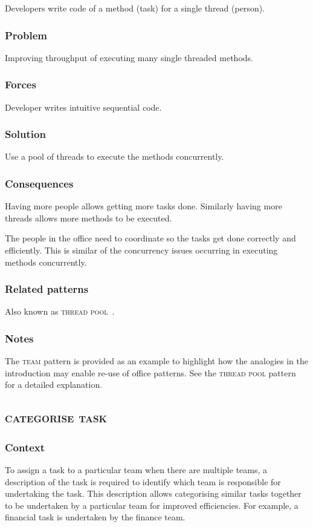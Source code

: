\documentclass[prodmode]{style/acmlarge}
\begin{document}
Developers write code of a method (task) for a single thread (person).

\subsubsection*{Problem} Improving throughput of executing many single threaded methods.

\subsubsection*{Forces} Developer writes intuitive sequential code.

\subsubsection*{Solution} Use a pool of threads to execute the methods
concurrently.

\subsubsection*{Consequences} Having more people allows getting more tasks done.
Similarly having more threads allows more methods to be executed.

The people in the office need to coordinate so the tasks get done correctly and
efficiently.  This is similar of the concurrency issues occurring in executing
methods concurrently.

\subsubsection*{Related patterns} Also known as \textsc{thread pool}~\cite{thread-per-request}.

\subsubsection*{Notes} The \textsc{team} pattern is provided as an example to
highlight how the analogies in the introduction may enable re-use of office
patterns. See the \textsc{thread pool} pattern~\cite{thread-per-request} for a
detailed explanation.



\subsection{\textsc{\textbf{categorise task}}}

\subsubsection*{Context} To assign a task to a particular team when there are multiple teams, a
description of the task is required to identify which team is responsible for
undertaking the task.  This description allows categorising similar tasks
together to be undertaken by a particular team for improved efficiencies.  For
example, a financial task is undertaken by the finance team.
\end{document}
